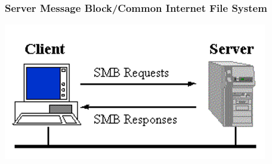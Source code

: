 \begin{frame}
    \frametitle{Server Message Block/Common Internet File System}
    \includegraphics[height=6cm]{../../slides/smb/images/smb.png}
\end{frame}